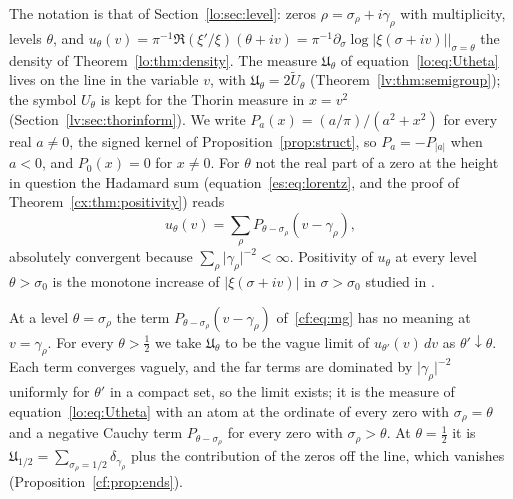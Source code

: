 The notation is that of Section~\ref{lo:sec:level}: zeros $\rho=\sigma_\rho+i\gamma_\rho$ with multiplicity, levels $\theta$, and $u_\theta(v)=\pi^{-1}\Re(\xi'/\xi)(\theta+iv)=\pi^{-1}\partial_\sigma\log\lvert\xi(\sigma+iv)\rvert|_{\sigma=\theta}$ the density of Theorem~\ref{lo:thm:density}. The measure $\mathfrak U_\theta$ of equation~\eqref{lo:eq:Utheta} lives on the line in the variable $v$, with $\mathfrak U_\theta=2\widetilde U_\theta$ (Theorem~\ref{lv:thm:semigroup}); the symbol $U_\theta$ is kept for the Thorin measure in $x=v^2$ (Section~\ref{lv:sec:thorinform}). We write $P_a(x)=(a/\pi)/(a^2+x^2)$ for every real $a\ne0$, the signed kernel of Proposition~\ref{prop:struct}, so $P_a=-P_{\lvert a\rvert}$ when $a<0$, and $P_0(x)=0$ for $x\ne0$. For $\theta$ not the real part of a zero at the height in question the Hadamard sum (equation~\eqref{es:eq:lorentz}, and the proof of Theorem~\ref{cx:thm:positivity}) reads
\begin{equation}\label{cf:eq:mg}
u_\theta(v)=\sum_\rho P_{\theta-\sigma_\rho}(v-\gamma_\rho),
\end{equation}
absolutely convergent because $\sum_\rho\lvert\gamma_\rho\rvert^{-2}<\infty$. Positivity of $u_\theta$ at every level $\theta>\sigma_0$ is the monotone increase of $\lvert\xi(\sigma+iv)\rvert$ in $\sigma>\sigma_0$ studied in \cite{SD10,MSZ14}.

\begin{remark}\label{cf:rem:limit}
At a level $\theta=\sigma_\rho$ the term $P_{\theta-\sigma_\rho}(v-\gamma_\rho)$ of~\eqref{cf:eq:mg} has no meaning at $v=\gamma_\rho$. For every $\theta>\frac12$ we take $\mathfrak U_\theta$ to be the vague limit of $u_{\theta'}(v)\,dv$ as $\theta'\downarrow\theta$. Each term converges vaguely, and the far terms are dominated by $\lvert\gamma_\rho\rvert^{-2}$ uniformly for $\theta'$ in a compact set, so the limit exists; it is the measure of equation~\eqref{lo:eq:Utheta} with an atom at the ordinate of every zero with $\sigma_\rho=\theta$ and a negative Cauchy term $P_{\theta-\sigma_\rho}$ for every zero with $\sigma_\rho>\theta$. At $\theta=\frac12$ it is $\mathfrak U_{1/2}=\sum_{\sigma_\rho=1/2}\delta_{\gamma_\rho}$ plus the contribution of the zeros off the line, which vanishes (Proposition~\ref{cf:prop:ends}).
\end{remark}

